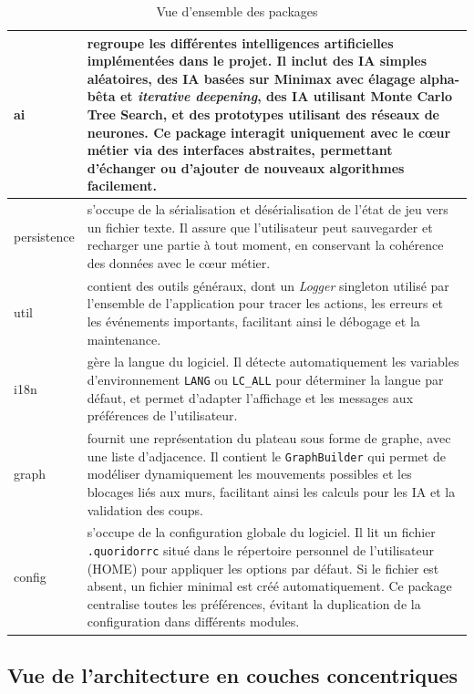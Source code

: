 \documentclass[a4paper]{article}
\begin{document}
\begin{table}[H]
\begin{tabular}{|p{2cm}|p{13cm}|}
    \hline
    ai & regroupe les différentes intelligences artificielles implémentées dans le projet. Il inclut des IA simples aléatoires, des IA basées sur Minimax avec élagage alpha-bêta et \textit{iterative deepening}, des IA utilisant Monte Carlo Tree Search, et des prototypes utilisant des réseaux de neurones. Ce package interagit uniquement avec le cœur métier via des interfaces abstraites, permettant d’échanger ou d’ajouter de nouveaux algorithmes facilement. \\
    \hline
    persistence & s’occupe de la sérialisation et désérialisation de l’état de jeu vers un fichier texte. Il assure que l’utilisateur peut sauvegarder et recharger une partie à tout moment, en conservant la cohérence des données avec le cœur métier. \\
    \hline
    util & contient des outils généraux, dont un \textit{Logger} singleton utilisé par l’ensemble de l’application pour tracer les actions, les erreurs et les événements importants, facilitant ainsi le débogage et la maintenance. \\
    \hline
    i18n & gère  la langue du logiciel. Il détecte automatiquement les variables d’environnement \texttt{LANG} ou \texttt{LC\_ALL} pour déterminer la langue par défaut, et permet d’adapter l’affichage et les messages aux préférences de l’utilisateur. \\
    \hline
    graph & fournit une représentation du plateau sous forme de graphe, avec une liste d’adjacence. Il contient le \texttt{GraphBuilder} qui permet de modéliser dynamiquement les mouvements possibles et les blocages liés aux murs, facilitant ainsi les calculs pour les IA et la validation des coups. \\
    \hline
    config & s’occupe de la configuration globale du logiciel. Il lit un fichier \texttt{.quoridorrc} situé dans le répertoire personnel de l’utilisateur (HOME) pour appliquer les options par défaut. Si le fichier est absent, un fichier minimal est créé automatiquement. Ce package centralise toutes les préférences, évitant la duplication de la configuration dans différents modules. \\
    \hline
\end{tabular}
\caption{Vue d'ensemble des packages}
\label{tab:packages}
\end{table}



\subsection{Vue de l'architecture en couches concentriques}
\end{document}
